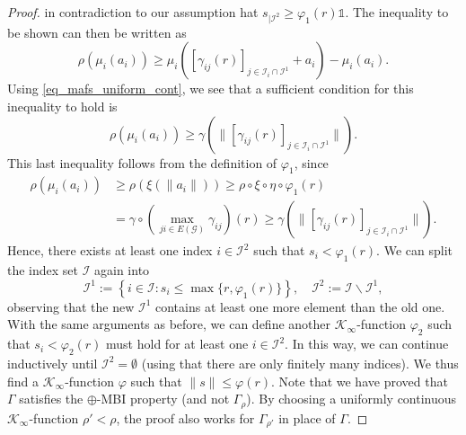 \documentclass[10pt,a4paper]{amsart}
\newcommand{\GC}{\mathcal{G}}
\newcommand{\IC}{\mathcal{I}}
\newcommand{\KC}{\mathcal{K}}
\newcommand{\unit}{\mathds{1}}
\begin{document}
\begin{proof}
in contradiction to our assumption hat $s_{|\IC^2} \geq \varphi_1(r)\unit$. The inequality to be shown can then be written as%
\begin{equation*}
  \rho(\mu_i(a_i)) \geq \mu_i([\gamma_{ij}(r)]_{j \in \IC_i \cap \IC^1} + a_i) - \mu_i(a_i).%
\end{equation*}
Using \eqref{eq_mafs_uniform_cont}, we see that a sufficient condition for this inequality to hold is%
\begin{equation*}
  \rho(\mu_i(a_i)) \geq \gamma( \|[\gamma_{ij}(r)]_{j \in \IC_i \cap \IC^1}\| ).%
\end{equation*}
This last inequality follows from the definition of $\varphi_1$, since%
\begin{align*}
  \rho(\mu_i(a_i)) &\geq \rho(\xi(\|a_i\|)) \geq \rho \circ \xi \circ \eta \circ \varphi_1(r) \\
	                 &= \gamma \circ \left(\max_{ji \in E(\GC)}\gamma_{ij}\right)(r) \geq \gamma( \|[\gamma_{ij}(r)]_{j \in \IC_i \cap \IC^1}\| ).%
\end{align*}
Hence, there exists at least one index $i \in \IC^2$ such that $s_i  < \varphi_1(r)$. We can split the index set $\IC$ again into%
\begin{equation*}
  \IC^1 := \left\{ i \in \IC : s_i \leq \max\{r,\varphi_1(r)\} \right\},\quad \IC^2 := \IC \backslash \IC^1,%
\end{equation*}
observing that the new $\IC^1$ contains at least one more element than the old one. With the same arguments as before, we can define another $\KC_{\infty}$-function $\varphi_2$ such that $s_i < \varphi_2(r)$ must hold for at least one $i \in \IC^2$. In this way, we can continue inductively until $\IC^2 = \emptyset$ (using that there are only finitely many indices). We thus find a $\KC_{\infty}$-function $\varphi$ such that $\|s\| \leq \varphi(r)$. Note that we have proved that $\Gamma$ satisfies the $\oplus$-MBI property (and not $\Gamma_{\rho}$). By choosing a uniformly continuous $\KC_{\infty}$-function $\rho' < \rho$, the proof also works for $\Gamma_{\rho'}$ in place of $\Gamma$.
\end{proof}
\end{document}
